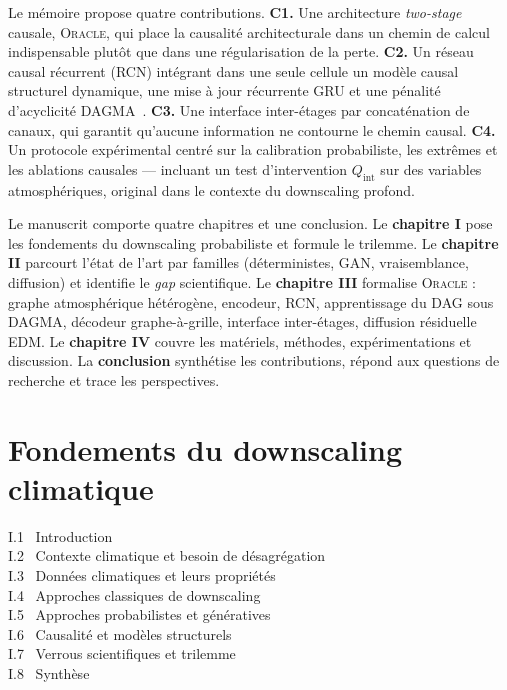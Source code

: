 \documentclass[14pt,a4paper,openany]{extreport}
\theoremstyle{definition}
\newcommand{\Oracle}{\textsc{Oracle}}
\begin{document}
Le mémoire propose quatre contributions. \textbf{C1.} Une architecture \emph{two-stage} causale, \Oracle{}, qui place la causalité architecturale dans un chemin de calcul indispensable plutôt que dans une régularisation de la perte. \textbf{C2.} Un réseau causal récurrent (RCN) intégrant dans une seule cellule un modèle causal structurel dynamique, une mise à jour récurrente GRU et une pénalité d'acyclicité DAGMA~\cite{bello_dagma_2022}. \textbf{C3.} Une interface inter-étages par concaténation de canaux, qui garantit qu'aucune information ne contourne le chemin causal. \textbf{C4.} Un protocole expérimental centré sur la calibration probabiliste, les extrêmes et les ablations causales --- incluant un test d'intervention $Q_{\mathrm{int}}$ sur des variables atmosphériques, original dans le contexte du downscaling profond.

Le manuscrit comporte quatre chapitres et une conclusion. Le \textbf{chapitre I} pose les fondements du downscaling probabiliste et formule le trilemme. Le \textbf{chapitre II} parcourt l'état de l'art par familles (déterministes, GAN, vraisemblance, diffusion) et identifie le \emph{gap} scientifique. Le \textbf{chapitre III} formalise \Oracle{} : graphe atmosphérique hétérogène, encodeur, RCN, apprentissage du DAG sous DAGMA, décodeur graphe-à-grille, interface inter-étages, diffusion résiduelle EDM. Le \textbf{chapitre IV} couvre les matériels, méthodes, expérimentations et discussion. La \textbf{conclusion} synthétise les contributions, répond aux questions de recherche et trace les perspectives.

\cleardoublepage



\chapter{Fondements du downscaling climatique}
\label{chap:fondements}

\begin{sommairebox}
\small
\noindent I.1 \ Introduction \dotfill \pageref{sec:intro}\\
\noindent I.2 \ Contexte climatique et besoin de désagrégation \dotfill \pageref{sec:contexte}\\
\noindent I.3 \ Données climatiques et leurs propriétés \dotfill \pageref{sec:donnees}\\
\noindent I.4 \ Approches classiques de downscaling \dotfill \pageref{sec:classiques}\\
\noindent I.5 \ Approches probabilistes et génératives \dotfill \pageref{sec:generatifs}\\
\noindent I.6 \ Causalité et modèles structurels \dotfill \pageref{sec:causalite}\\
\noindent I.7 \ Verrous scientifiques et trilemme \dotfill \pageref{sec:verrous}\\
\noindent I.8 \ Synthèse \dotfill \pageref{sec:synthese}
\end{sommairebox}
\end{document}
